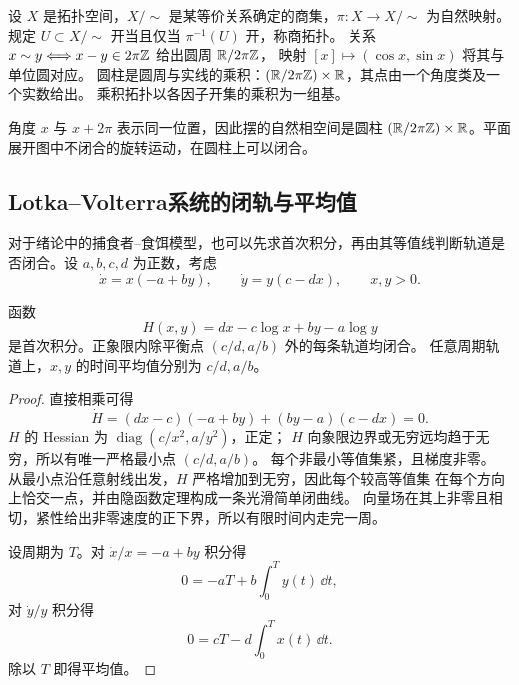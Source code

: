 \begin{definition}\label{def:quotient-circle}
设 $X$ 是拓扑空间，$X/{\sim}$ 是某等价关系确定的商集，$\pi:X\to X/{\sim}$ 为自然映射。规定 $U\subset X/{\sim}$ 开当且仅当 $\pi^{-1}(U)$ 开，称商拓扑。
关系 $x\sim y\Longleftrightarrow x-y\in2\pi\mathbb{Z}$ 给出圆周 $\mathbb{R}/2\pi\mathbb{Z}$，
映射 $[x]\mapsto(\cos x,\sin x)$ 将其与单位圆对应。
圆柱是圆周与实线的乘积：$(\mathbb{R}/2\pi\mathbb{Z})\times\mathbb{R}$，其点由一个角度类及一个实数给出。
乘积拓扑以各因子开集的乘积为一组基。
\end{definition}

角度 $x$ 与 $x+2\pi$ 表示同一位置，因此摆的自然相空间是圆柱
$(\mathbb{R}/2\pi\mathbb{Z})\times\mathbb{R}$。平面展开图中不闭合的旋转运动，在圆柱上可以闭合。


\subsection*{Lotka--Volterra系统的闭轨与平均值}
\label{sec:lv-energy}
对于绪论中的捕食者--食饵模型，也可以先求首次积分，再由其等值线判断轨道是否闭合。设 $a,b,c,d$ 为正数，考虑
\[
 \dot x=x(-a+by),\qquad \dot y=y(c-dx),\qquad x,y>0.
\]
\begin{theorem}
函数
\[
 H(x,y)=dx-c\log x+by-a\log y
\]
是首次积分。正象限内除平衡点 $(c/d,a/b)$ 外的每条轨道均闭合。
任意周期轨道上，$x,y$ 的时间平均值分别为 $c/d,a/b$。
\end{theorem}
\begin{proof}
直接相乘可得
\[
 \dot H=(dx-c)(-a+by)+(by-a)(c-dx)=0.
\]
$H$ 的 Hessian 为 $\operatorname{diag}(c/x^2,a/y^2)$，正定；
$H$ 向象限边界或无穷远均趋于无穷，所以有唯一严格最小点 $(c/d,a/b)$。
每个非最小等值集紧，且梯度非零。
从最小点沿任意射线出发，$H$ 严格增加到无穷，因此每个较高等值集
在每个方向上恰交一点，并由隐函数定理构成一条光滑简单闭曲线。
向量场在其上非零且相切，紧性给出非零速度的正下界，所以有限时间内走完一周。

设周期为 $T$。对 $\dot x/x=-a+by$ 积分得
\[
 0=-aT+b\displaystyle\int_0^Ty(t)\,\dd t,
\]
对 $\dot y/y$ 积分得
\[
 0=cT-d\displaystyle\int_0^Tx(t)\,\dd t.
\]
除以 $T$ 即得平均值。
\end{proof}


